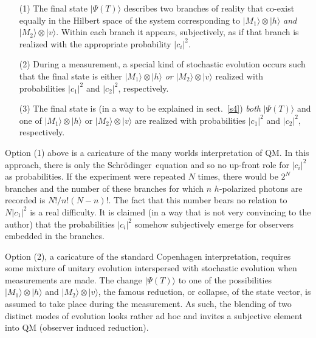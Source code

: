 \documentclass[12pt]{article}
\theoremstyle{plain}
\theoremstyle{definition}
\theoremstyle{remark}
\def\SCH{Schr\"odinger\ }
\def\ket#1{| #1\rangle}
\begin{document}
\begin{enumerate}
\item[(1)] The final state $\ket{\Psi(T)}$ describes two branches of reality that co-exist equally in the Hilbert space of the system corresponding to $\ket{M_1}\otimes\ket{h}$ {\it and\/} $\ket{M_2}\otimes\ket{v}$. Within each branch it appears, subjectively, as if that branch is realized with the appropriate probability $|c_i|^2$.

\item[(2)] During a measurement, a special kind of stochastic evolution occurs such that the final state is either $\ket{M_1}\otimes\ket{h}$ {\it or\/} $\ket{M_2}\otimes\ket{v}$ realized with probabilities $|c_1|^2$ and $|c_2|^2$, respectively.

\item[(3)] The final state is (in a way to be explained in sect.~\ref{s4}) {\it both\/} $\ket{\Psi(T)}$ and one of $\ket{M_1}\otimes\ket{h}$ or $\ket{M_2}\otimes\ket{v}$ are realized with probabilities $|c_1|^2$ and $|c_2|^2$, respectively.
\end{enumerate}
\noindent
Option (1) above is a caricature of the many worlds interpretation of QM. 
In this approach, there is only the \SCH equation and so no up-front role for $|c_i|^2$ as probabilities. If the experiment were repeated $N$ times, there would be $2^N$ branches and the number of these branches for which $n$ $h$-polarized photons are recorded is $N!/n!(N-n)!$. The fact that this number bears no relation to $N|c_1|^2$ is a real difficulty.
It is claimed  \cite{Wallace} (in a way that is not very convincing to the author) that the probabilities $|c_i|^2$ somehow subjectively emerge for observers embedded in the branches. 

Option (2), a caricature of the standard Copenhagen interpretation, requires some mixture of unitary evolution interspersed with stochastic evolution when measurements are made. The change $\ket{\Psi(T)}$ to one of the possibilities $\ket{M_1}\otimes\ket{h}$ and $\ket{M_2}\otimes\ket{v}$, the famous reduction, or collapse, of the state vector, is assumed to take place during the measurement. As such, the blending of two distinct modes of evolution looks rather ad hoc and invites a subjective element into QM (observer induced reduction). 
\end{document}
